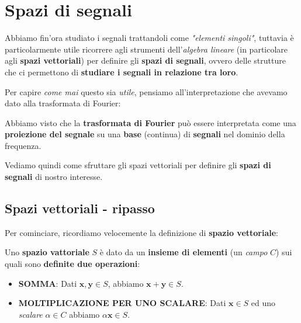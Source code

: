 \chapter{Spazi di segnali}

Abbiamo fin'ora studiato i segnali trattandoli come \textit{"elementi singoli"},
tuttavia è particolarmente utile ricorrere agli strumenti dell'\textit{algebra lineare}
(in particolare agli \textbf{spazi vettoriali}) per definire gli \textbf{spazi di segnali},
ovvero delle strutture che ci permettono di \textbf{studiare i segnali in relazione tra loro}.

Per capire \textit{come mai} questo sia \textit{utile}, pensiamo all'interpretazione
che avevamo dato alla trasformata di Fourier:

\begin{remark}
    Abbiamo visto che la \textbf{trasformata di Fourier} può essere interpretata
    come una \textbf{proiezione del segnale} su una \textbf{base} (continua)
    di \textbf{segnali} nel dominio della frequenza.
\end{remark}

Vediamo quindi come sfruttare gli spazi vettoriali per definire
gli \textbf{spazi di segnali} di nostro interesse.

\section{Spazi vettoriali - ripasso}

Per cominciare, ricordiamo velocemente la definizione di \textbf{spazio vettoriale}:

\begin{definition}
    Uno \textbf{spazio vattoriale} $S$ è dato da un \textbf{insieme di elementi} 
    (un \textit{campo} $C$) sui quali sono \textbf{definite due operazioni}:
    \begin{itemize}
        \item \textbf{SOMMA}: Dati $\mathbf{x},\mathbf{y}\in S$, 
            abbiamo $\mathbf{x} + \mathbf{y}\in S$.
        \item \textbf{MOLTIPLICAZIONE PER UNO SCALARE}: Dati $\mathbf{x}\in S$ ed
            uno \textit{scalare} $\alpha \in C$ abbiamo $\alpha \mathbf{x} \in S$. 
    \end{itemize}
\end{definition}

